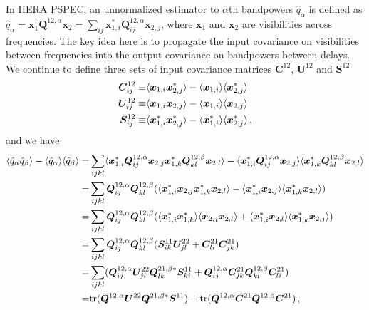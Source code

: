 \documentclass[12pt,a4paper]{article}
\begin{document}
In HERA PSPEC, an unnormalized estimator to $\alpha$th bandpowers $\hat{q}_\alpha$ is defined as $\hat{q}_\alpha = \bm{x}_1^\dagger \bm{Q}^{12,\alpha} \bm{x}_2 = \sum_{ij} \bm{x}_{1,i}^*\bm{Q}^{12,\alpha}_{ij}\bm{x}_{2,j}$, where $\bm{x}_{1}$ and $\bm{x}_{2}$ are visibilities across frequencies. The key idea here is to propagate the input covariance on visibilities between frequencies into the output covariance on bandpowers between delays. We continue to define three sets of input covariance matrices $\bm{C}^{12}$, $\bm{U}^{12}$ and $\bm{S}^{12}$
\begin{align}
\bm{C}^{12}_{ij} \equiv & \langle \bm{x}_{1,i} \bm{x}_{2,j}^* \rangle - \langle \bm{x}_{1,i} \rangle \langle \bm{x}_{2,j}^*\rangle \notag\\
\bm{U}^{12}_{ij} \equiv & \langle \bm{x}_{1,i} \bm{x}_{2,j}\rangle - \langle \bm{x}_{1,i}\rangle\langle \bm{x}_{2,j}\rangle \notag \\
\bm{S}^{12}_{ij} \equiv & \langle \bm{x}_{1,i}^* \bm{x}_{2,j}^*\rangle - \langle \bm{x}_{1,i}^*\rangle \langle \bm{x}_{2,j}^*\rangle \,,
\end{align}
and we have
\begin{align}
\langle \hat{q}_\alpha \hat{q}_\beta \rangle - \langle \hat{q}_\alpha \rangle\langle \hat{q}_\beta\rangle =& 
\sum_{ijkl}\langle \bm{x}_{1,i}^*\bm{Q}^{12,\alpha}_{ij}\bm{x}_{2,j}\bm{x}_{1,k}^*\bm{Q}^{12,\beta}_{kl}\bm{x}_{2,l}\rangle - \langle \bm{x}_{1,i}^*\bm{Q}^{12,\alpha}_{ij}\bm{x}_{2,j}\rangle\langle \bm{x}_{1,k}^*\bm{Q}^{12,\beta}_{kl}\bm{x}_{2,l}\rangle\notag\\
=&\sum_{ijkl}\bm{Q}^{12,\alpha}_{ij}\bm{Q}^{12,\beta}_{kl}(\langle \bm{x}_{1,i}^*\bm{x}_{2,j}\bm{x}_{1,k}^*\bm{x}_{2,l}\rangle - \langle \bm{x}_{1,i}^*\bm{x}_{2,j}\rangle\langle \bm{x}_{1,k}^*\bm{x}_{2,l}\rangle)\notag\\
=&\sum_{ijkl}\bm{Q}^{12,\alpha}_{ij}\bm{Q}^{12,\beta}_{kl}(\langle \bm{x}_{1,i}^*\bm{x}_{1,k}^*\rangle\langle \bm{x}_{2,j}\bm{x}_{2,l}\rangle + \langle \bm{x}_{1,i}^*\bm{x}_{2,l}\rangle \langle \bm{x}_{1,k}^*\bm{x}_{2,j}\rangle)\notag\\
=&\sum_{ijkl}\bm{Q}^{12,\alpha}_{ij}\bm{Q}^{12,\beta}_{kl} (\bm{S}_{ik}^{11}\bm{U}_{jl}^{22} + \bm{C}^{21}_{li}\bm{C}^{21}_{jk})\notag\\
=&\sum_{ijkl}( \bm{Q}^{12,\alpha}_{ij}\bm{U}_{jl}^{22}\bm{Q}^{21,\beta*}_{lk} \bm{S}_{ki}^{11} + \bm{Q}^{12,\alpha}_{ij}\bm{C}^{21}_{jk} \bm{Q}^{12,\beta}_{kl} \bm{C}^{21}_{li} ) \notag\\
=&\text{tr}(\bm{Q}^{12,\alpha} \bm{U}^{22} \bm{Q}^{21,\beta*} \bm{S}^{11}) + \text{tr}(\bm{Q}^{12,\alpha} \bm{C}^{21} \bm{Q}^{12,\beta} \bm{C}^{21}) \,,
\end{align}
\end{document}
